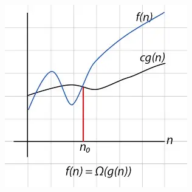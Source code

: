 \begin{frame}
\begin{columns}
    \begin{column}{0.3\textwidth}
      \includegraphics[width=\textwidth]{figures/MasterTheorem/omega.jpg}
    \end{column}
  \end{columns}
\end{frame}


